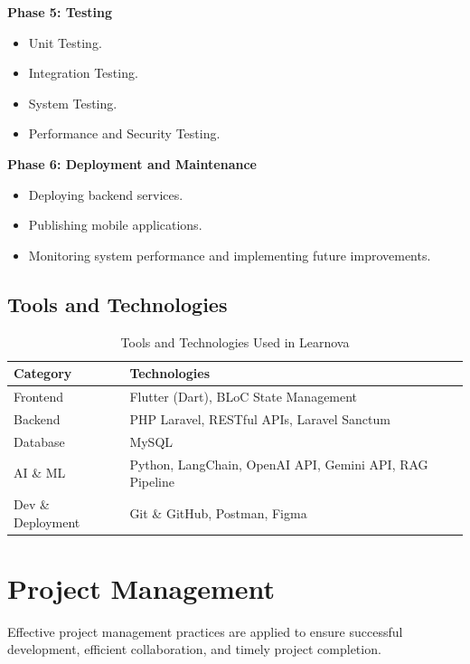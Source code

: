 \textbf{Phase 5: Testing}
\begin{itemize}
  \item Unit Testing.
  \item Integration Testing.
  \item System Testing.
  \item Performance and Security Testing.
\end{itemize}

\textbf{Phase 6: Deployment and Maintenance}
\begin{itemize}
  \item Deploying backend services.
  \item Publishing mobile applications.
  \item Monitoring system performance and implementing future improvements.
\end{itemize}

\subsection{Tools and Technologies}

\begin{table}[H]
\centering
\caption{Tools and Technologies Used in Learnova}
\begin{tabularx}{\textwidth}{|l|X|}
\hline
\textbf{Category} & \textbf{Technologies} \\
\hline
Frontend          & Flutter (Dart), BLoC State Management \\
\hline
Backend           & PHP Laravel, RESTful APIs, Laravel Sanctum \\
\hline
Database          & MySQL \\
\hline
AI \& ML          & Python, LangChain, OpenAI API, Gemini API, RAG Pipeline \\
\hline
Dev \& Deployment & Git \& GitHub, Postman, Figma \\
\hline
\end{tabularx}
\label{tab:tools}
\end{table}

\section{Project Management}
\label{sec:management}

Effective project management practices are applied to ensure successful
development, efficient collaboration, and timely project completion.


